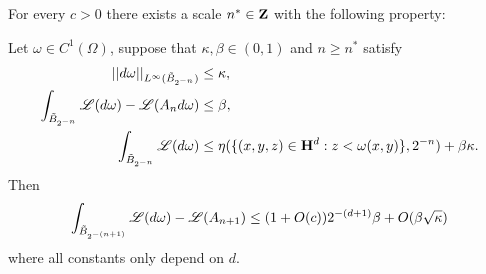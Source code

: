 \begin{lemma}\label{DGL1}
For every $c > 0$ there exists a scale $n^* \in \mathbf{Z}$ with the following property:

Let $\omega \in C^1(\Omega)$, suppose that $\kappa, \beta \in (0, 1)$ and $n \geq n^*$ satisfy
\begin{align}
||d\omega||_{L^\infty(\tilde B_{2^{-n}})} &\leq \kappa, \label{DGL1 1}\\
\int_{\tilde B_{2^{-n}}} \mathscr L(d\omega) - \mathscr L(A_n d\omega) &\leq \beta, \label{DGL1 2}\\
\int_{\tilde B_{2^{-n}}} \mathscr L(d\omega) &\leq \eta(\{(x, y, z) \in \mathbf H^d: z < \omega(x, y)\}, 2^{-n}) + \beta \kappa. \label{DGL1 3}
\end{align}
Then
$$\int_{\tilde B_{2^{-(n + 1)}}}\mathscr L(d\omega) - \mathscr L(A_{n + 1}) \leq (1 + O(c)) 2^{-(d + 1)} \beta + O(\beta \sqrt \kappa)$$
where all constants only depend on $d$.
\end{lemma}
